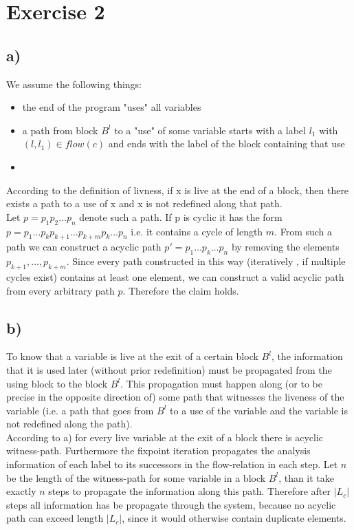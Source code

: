 \documentclass[fleqn,12pt]{article}
\begin{document}
\section*{Exercise 2}
\subsection*{a)}
We assume the following things:
\begin{itemize}
\item the end of the program "uses" all variables
\item a path from block $B^l$ to a "use" of some variable starts with a label $l_1$ with $(l,l_1)\in flow(c)$ and ends with the label of the block containing that use
\item 
\end{itemize}
According to the definition of livness, if x is live at the end of a block, then there exists a path to a use of x and x is not redefined along that path.\\
Let $p=p_1p_2\dots p_n$ denote such a path. If p is cyclic it has the form $p=p_1\dots p_kp_{k+1}\dots p_{k+m}p_k\dots p_n$ i.e. it contains a cycle of length $m$.
From such a path we can construct a acyclic path $p'=p_1\dots p_k \dots p_n$ by removing the elements $p_{k+1},\dots ,p_{k+m}$.
Since every path constructed in this way (iteratively , if multiple cycles exist) contains at least one element, we can construct a valid acyclic path from every arbitrary path $p$.
Therefore the claim holds.
\subsection*{b)}
To know that a variable is live at the exit of a certain block $B^l$, the information that it is used later (without prior redefinition) must be propagated from the using block to the block $B^l$.
This propagation must happen along (or to be precise in the opposite direction of) some path that witnesses the liveness of the variable (i.e. a path that goes from $B^l$ to a use of the variable and the variable is not redefined along the path).\\
According to a) for every live variable at the exit of a block there is acyclic witness-path.
Furthermore the fixpoint iteration propagates the analysis information of each label to its successors in the flow-relation in each step.
Let $n$ be the length of the witness-path for some variable in a block $B^l$, than it take exactly $n$ steps to propagate the information along this path.
Therefore after $|L_c|$ steps all information has be propagate through the system, because no acyclic path can exceed length $|L_c|$, since it would otherwise contain duplicate elements.
\end{document}

